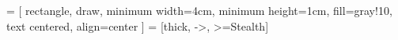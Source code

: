 \usepackage{tikz}
\usetikzlibrary{shapes.geometric, shapes.multipart, arrows.meta, positioning}

 = [
  rectangle, draw, minimum width=4cm,
  minimum height=1cm, fill=gray!10,
  text centered, align=center
]
 = [thick, ->, >=Stealth]
